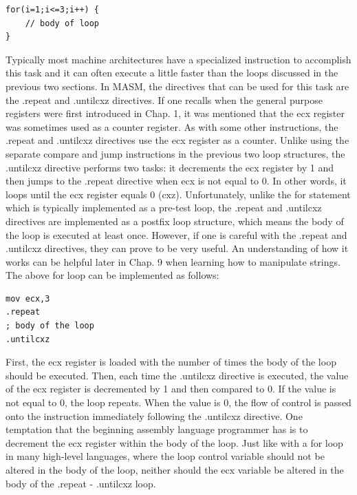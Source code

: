 \documentclass[10pt]{book}
\begin{document}
\begin{verbatim}
for(i=1;i<=3;i++) {
    // body of loop
}
\end{verbatim}

Typically most machine architectures have a specialized instruction to accomplish this task and it can often execute a little faster than the loops discussed in the previous two sections. In MASM, the directives that can be used for this task are the .repeat and .untilcxz directives. If one recalls when the general purpose registers were first introduced in Chap. 1, it was mentioned that the ecx register was sometimes used as a counter register. As with some other instructions, the .repeat and .untilcxz directives use the ecx register as a counter. Unlike using the separate compare and jump instructions in the previous two loop structures, the .untilcxz directive performs two tasks: it decrements the ecx register by 1 and then jumps to the .repeat directive when ecx is not equal to 0. In other words, it loops until the ecx register equals 0 (cxz). Unfortunately, unlike the for statement which is typically implemented as a pre-test loop, the .repeat and .untilcxz directives are implemented as a postfix loop structure, which means the body of the loop is executed at least once. However, if one is careful with the .repeat and .untilcxz directives, they can prove to be very useful. An understanding of how it works can be helpful later in Chap. 9 when learning how to manipulate strings. The above for loop can be implemented as follows:

\begin{verbatim}
mov ecx,3
.repeat
; body of the loop
.untilcxz
\end{verbatim}

First, the ecx register is loaded with the number of times the body of the loop should be executed. Then, each time the .untilcxz directive is executed, the value of the ecx register is decremented by 1 and then compared to 0. If the value is not equal to 0, the loop repeats. When the value is 0, the flow of control is passed onto the instruction immediately following the .untilcxz directive.
One temptation that the beginning assembly language programmer has is to decrement the ecx register within the body of the loop. Just like with a for loop in many high-level languages, where the loop control variable should not be altered in the body of the loop, neither should the ecx variable be altered in the body of the .repeat - .untilcxz loop.
\end{document}
